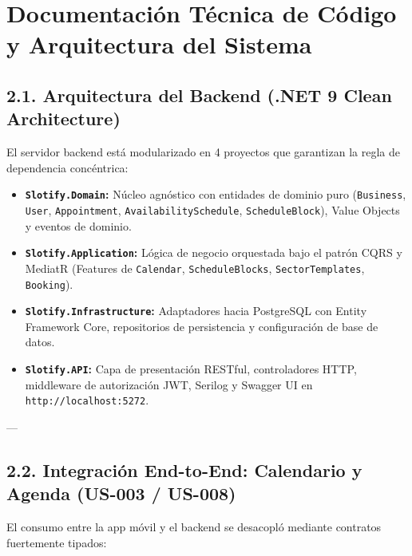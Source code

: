 \documentclass[11pt,letterpaper]{article}
\begin{document}
\section{Documentación Técnica de Código y Arquitectura del Sistema}

\subsection{2.1. Arquitectura del Backend (.NET 9 Clean Architecture)}
El servidor backend está modularizado en 4 proyectos que garantizan la regla de dependencia concéntrica:

\begin{itemize}[leftmargin=0.8cm]
    \item \textbf{\texttt{Slotify.Domain}:} Núcleo agnóstico con entidades de dominio puro (\texttt{Business}, \texttt{User}, \texttt{Appointment}, \texttt{AvailabilitySchedule}, \texttt{ScheduleBlock}), Value Objects y eventos de dominio.
    \item \textbf{\texttt{Slotify.Application}:} Lógica de negocio orquestada bajo el patrón CQRS y MediatR (Features de \texttt{Calendar}, \texttt{ScheduleBlocks}, \texttt{SectorTemplates}, \texttt{Booking}).
    \item \textbf{\texttt{Slotify.Infrastructure}:} Adaptadores hacia PostgreSQL con Entity Framework Core, repositorios de persistencia y configuración de base de datos.
    \item \textbf{\texttt{Slotify.API}:} Capa de presentación RESTful, controladores HTTP, middleware de autorización JWT, Serilog y Swagger UI en \texttt{http://localhost:5272}.
\end{itemize}

---

\subsection{2.2. Integración End-to-End: Calendario y Agenda (US-003 / US-008)}
El consumo entre la app móvil y el backend se desacopló mediante contratos fuertemente tipados:
\end{document}
